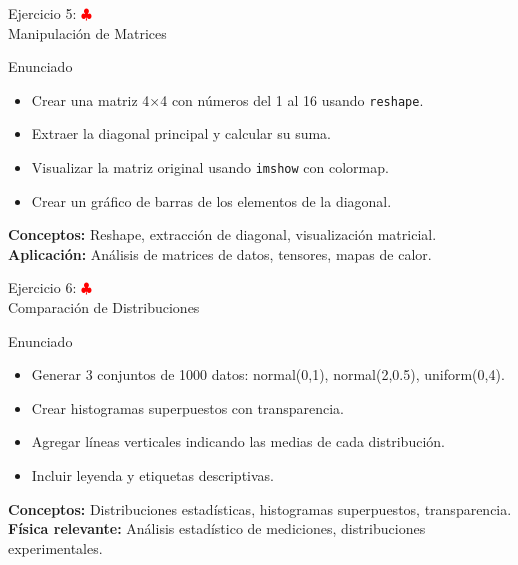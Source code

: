 \documentclass[10pt]{beamer}
\begin{document}
\begin{frame}{Ejercicio 5: \hfill \textcolor{red}{$\clubsuit$} \\ Manipulación de Matrices}
  \begin{block}{Enunciado}
    \begin{itemize}
      \item Crear una matriz 4×4 con números del 1 al 16 usando \texttt{reshape}.
      \item Extraer la diagonal principal y calcular su suma.
      \item Visualizar la matriz original usando \texttt{imshow} con colormap.
      \item Crear un gráfico de barras de los elementos de la diagonal.
    \end{itemize}
  \end{block}
  
  \textbf{Conceptos:} Reshape, extracción de diagonal, visualización matricial.
  \\
  \textbf{Aplicación:} Análisis de matrices de datos, tensores, mapas de calor.
\end{frame}

\begin{frame}{Ejercicio 6: \hfill \textcolor{red}{$\clubsuit$} \\ Comparación de Distribuciones}
  \begin{block}{Enunciado}
    \begin{itemize}
      \item Generar 3 conjuntos de 1000 datos: normal(0,1), normal(2,0.5), uniform(0,4).
      \item Crear histogramas superpuestos con transparencia.
      \item Agregar líneas verticales indicando las medias de cada distribución.
      \item Incluir leyenda y etiquetas descriptivas.
    \end{itemize}
  \end{block}
  
  \textbf{Conceptos:} Distribuciones estadísticas, histogramas superpuestos, transparencia.
  \\
  \textbf{Física relevante:} Análisis estadístico de mediciones, distribuciones experimentales.
\end{frame}
\end{document}
